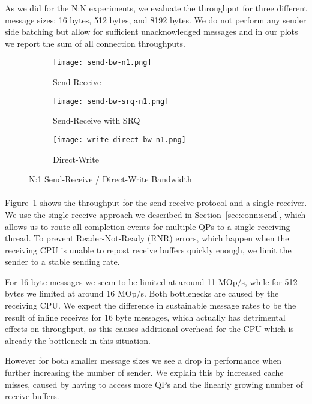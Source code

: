 As we did for the N:N experiments, we evaluate the throughput for three different message sizes: 16 bytes, 
512 bytes, and 8192 bytes. We do not perform any sender side batching but allow for sufficient unacknowledged messages 
and in our plots we report the sum of all connection throughputs.


\begin{figure}[ht]
  \centering
\begin{subfigure}[b]{0.49\textwidth}
  \centering
  \texttt{[image: send-bw-n1.png]}
  \caption{Send-Receive}
  \label{fig:plot-sndrcv-bw-n1-nosrq}
\end{subfigure}
\begin{subfigure}[b]{0.49\textwidth}
  \centering
  \texttt{[image: send-bw-srq-n1.png]}
  \caption{Send-Receive with SRQ}
  \label{fig:plot-sndrcv-bw-n1-srq}
\end{subfigure}
  \begin{subfigure}[b]{0.48\textwidth}
  \centering
  \texttt{[image: write-direct-bw-n1.png]}
  \caption{Direct-Write}
  \label{fig:plot-wdir-bw-n1}
  \end{subfigure}
\caption{N:1 Send-Receive / Direct-Write Bandwidth}
  \label{fig:plot-sndrcv-bw-n1}
\end{figure}



\paragraph{} Figure~\ref{fig:plot-sndrcv-bw-n1-nosrq} shows the throughput for the send-receive protocol and a single receiver. We
use the single receive approach we described in Section~\ref{sec:conn:send}, which allows us to route all completion events for 
multiple QPs to a single receiving thread. To prevent Reader-Not-Ready (RNR) errors, which happen when the receiving CPU is 
unable to repost receive buffers quickly enough, we limit the sender to a stable sending rate.

For 16 byte messages we seem to be limited at around 11 MOp/s, while for 512 bytes we limited at around 16 MOp/s. Both bottlenecks
are caused by the receiving CPU. We expect the difference in sustainable message rates to be the result of inline receives for 
16 byte messages, which actually has detrimental effects on throughput, as this causes additional overhead for the CPU which 
is already the bottleneck in this situation.

However for both smaller message sizes we see a drop in performance when further increasing the number of sender. We explain 
this by increased cache misses, caused by having to access more QPs and the linearly growing number of receive buffers.

